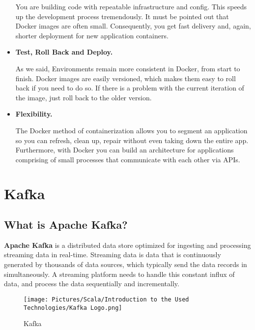 \begin{spacing}{1.5}
\begin{itemize}
    You are building code with repeatable infrastructure and config. This speeds up the development process tremendously. It must be pointed out that Docker images are often small. Consequently, you get fast delivery and, again, shorter deployment for new application containers.\vspace{.25cm}
   \item \textbf{Test, Roll Back and Deploy.}
    
    As we said, Environments remain more consistent in Docker, from start to finish. Docker images are easily versioned, which makes them easy to roll back if you need to do so. If there is a problem with the current iteration of the image, just roll back to the older version.\vspace{.25cm}
   \item \textbf{Flexibility.}
    
    The Docker method of containerization allows you to segment an application so you can refresh, clean up, repair without even taking down the entire app. Furthermore, with Docker you can build an architecture for applications comprising of small processes that communicate with each other via APIs.
\end{itemize}   

\newpage

\section{Kafka} 
 \subsection{What is Apache Kafka?}
 \par  \textbf{Apache Kafka} is a distributed data store optimized for ingesting and processing streaming data in real-time. Streaming data is data that is continuously generated by thousands of data sources, which typically send the data records in simultaneously. A streaming platform needs to handle this constant influx of data, and process the data sequentially and incrementally.
\\ 
 
\begin{figure}[!htb] 
\begin{center} 
\texttt{[image: Pictures/Scala/Introduction to the Used Technologies/Kafka Logo.png]}
\end{center} 
\caption{Kafka} 
\end{figure}  \FloatBarrier
\\


\end{spacing}
